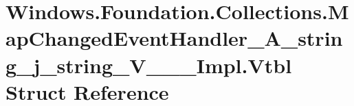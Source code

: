 \hypertarget{struct_windows_1_1_foundation_1_1_collections_1_1_map_changed_event_handler___a__string__j__string___v_______impl_1_1_vtbl}{}\section{Windows.\+Foundation.\+Collections.\+Map\+Changed\+Event\+Handler\+\_\+\+A\+\_\+string\+\_\+j\+\_\+string\+\_\+\+V\+\_\+\+\_\+\+\_\+\+Impl.\+Vtbl Struct Reference}
\label{struct_windows_1_1_foundation_1_1_collections_1_1_map_changed_event_handler___a__string__j__string___v_______impl_1_1_vtbl}
